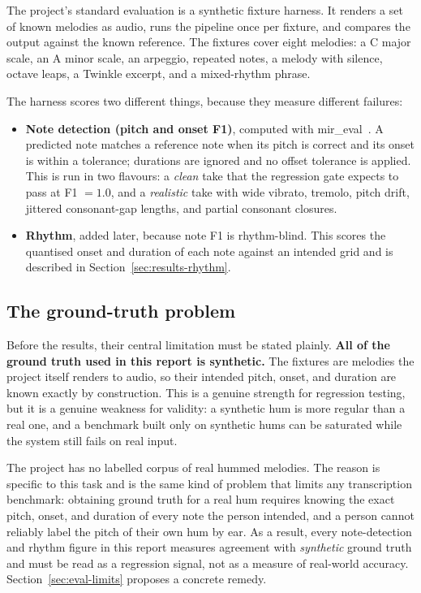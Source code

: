 \documentclass[12pt,a4paper]{article}
\begin{document}
The project's standard evaluation is a synthetic fixture harness. It renders a
set of known melodies as audio, runs the pipeline once per fixture, and
compares the output against the known reference. The fixtures cover eight
melodies: a C major scale, an A minor scale, an arpeggio, repeated notes, a
melody with silence, octave leaps, a Twinkle excerpt, and a mixed-rhythm
phrase.

The harness scores two different things, because they measure different
failures:

\begin{itemize}
    \item \textbf{Note detection (pitch and onset F1)}, computed with
    mir\_eval~\cite{mireval}. A predicted note matches a reference note when its
    pitch is correct and its onset is within a tolerance; durations are ignored
    and no offset tolerance is applied. This is run in two flavours: a
    \emph{clean} take that the regression gate expects to pass at F1 $=1.0$, and
    a \emph{realistic} take with wide vibrato, tremolo, pitch drift, jittered
    consonant-gap lengths, and partial consonant closures.
    \item \textbf{Rhythm}, added later, because note F1 is rhythm-blind. This
    scores the quantised onset and duration of each note against an intended
    grid and is described in Section~\ref{sec:results-rhythm}.
\end{itemize}

\subsection{The ground-truth problem}
\label{sec:groundtruth}

Before the results, their central limitation must be stated plainly. \textbf{All
of the ground truth used in this report is synthetic.} The fixtures are
melodies the project itself renders to audio, so their intended pitch, onset,
and duration are known exactly by construction. This is a genuine strength for
regression testing, but it is a genuine weakness for validity: a synthetic hum
is more regular than a real one, and a benchmark built only on synthetic hums
can be saturated while the system still fails on real input.

The project has no labelled corpus of real hummed melodies. The reason is
specific to this task and is the same kind of problem that limits any
transcription benchmark: obtaining ground truth for a real hum requires knowing
the exact pitch, onset, and duration of every note the person intended, and a
person cannot reliably label the pitch of their own hum by ear. As a result,
every note-detection and rhythm figure in this report measures agreement with
\emph{synthetic} ground truth and must be read as a regression signal, not as a
measure of real-world accuracy. Section~\ref{sec:eval-limits} proposes a
concrete remedy.
\end{document}
